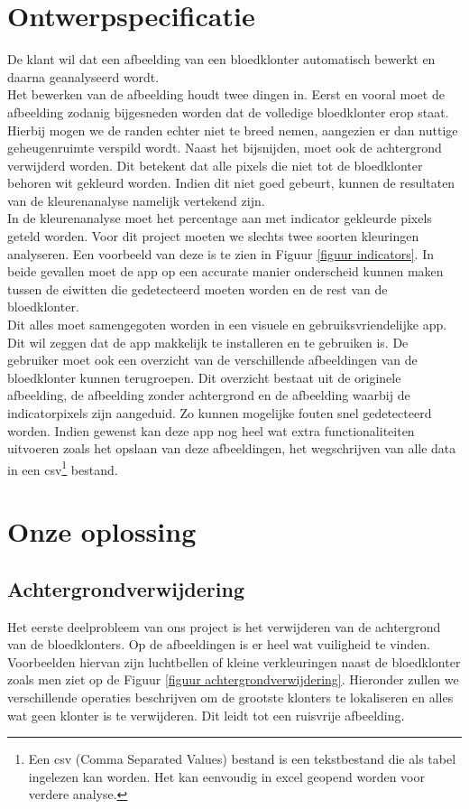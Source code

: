 \documentclass[a4paper,kulak]{kulakarticle}
\begin{document}
	\section{Ontwerpspecificatie}
		De klant wil dat een afbeelding van een bloedklonter automatisch bewerkt en daarna geanalyseerd wordt.\\
		Het bewerken van de afbeelding houdt twee dingen in. Eerst en vooral moet de afbeelding zodanig bijgesneden worden dat de volledige bloedklonter erop staat. Hierbij mogen we de randen echter niet te breed nemen, aangezien er dan nuttige geheugenruimte verspild wordt. 
		Naast het bijsnijden, moet ook de achtergrond verwijderd worden. Dit betekent dat alle pixels die niet tot de bloedklonter behoren wit gekleurd worden. Indien dit niet goed gebeurt, kunnen de resultaten van de kleurenanalyse namelijk vertekend zijn.\\
		In de kleurenanalyse moet het percentage aan met indicator gekleurde pixels geteld worden. Voor dit project moeten we slechts twee soorten kleuringen analyseren. Een voorbeeld van deze is te zien in Figuur \ref{figuur indicators}. In beide gevallen moet de app op een accurate manier onderscheid kunnen maken tussen de eiwitten die gedetecteerd moeten worden en de rest van de bloedklonter. \\
		Dit alles moet samengegoten worden in een visuele en gebruiksvriendelijke app. Dit wil zeggen dat de app makkelijk te installeren en te gebruiken is. De gebruiker moet ook een overzicht van de verschillende afbeeldingen van de bloedklonter kunnen terugroepen. Dit overzicht bestaat uit de originele afbeelding, de afbeelding zonder achtergrond en de afbeelding waarbij de indicatorpixels zijn aangeduid. Zo kunnen mogelijke fouten snel gedetecteerd worden. Indien gewenst kan deze app nog heel wat extra functionaliteiten uitvoeren zoals het opslaan van deze afbeeldingen, het wegschrijven van alle data in een csv\footnote{Een csv (Comma Separated Values) bestand is een tekstbestand die als tabel ingelezen kan worden. Het kan eenvoudig in excel geopend worden voor verdere analyse.} bestand.
	
	\section{Onze oplossing}

		\subsection{Achtergrondverwijdering}
			Het eerste deelprobleem van ons project is het verwijderen van de achtergrond van de bloedklonters. Op de afbeeldingen is er heel wat vuiligheid te vinden. Voorbeelden hiervan zijn luchtbellen of kleine verkleuringen naast de bloedklonter zoals men ziet op de Figuur \ref{figuur achtergrondverwijdering}. Hieronder zullen we verschillende operaties beschrijven om de grootste klonters te lokaliseren en alles wat geen klonter is te verwijderen. Dit leidt tot een ruisvrije afbeelding.
\end{document}
